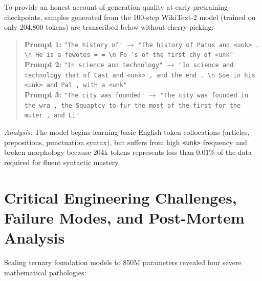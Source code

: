 \documentclass[11pt,a4paper]{article}
\begin{document}
To provide an honest account of generation quality at early pretraining checkpoints, samples generated from the 100-step WikiText-2 model (trained on only 204,800 tokens) are transcribed below without cherry-picking:
\begin{quote}
\small
\textbf{Prompt 1:} \texttt{"The history of"} $\to$ \texttt{"The history of Patus and <unk> . \textbackslash n He is a fewotes = = \textbackslash n Fo 's of the first chy of <unk"}\\
\textbf{Prompt 2:} \texttt{"In science and technology"} $\to$ \texttt{"In science and technology that of Cast and <unk> , and the end . \textbackslash n Soe in his <unk> and Pal , with a <unk"}\\
\textbf{Prompt 3:} \texttt{"The city was founded"} $\to$ \texttt{"The city was founded in the wra , the Squaptcy to fur the most of the first for the muter , and Li"}
\end{quote}
\textit{Analysis:} The model begins learning basic English token collocations (articles, prepositions, punctuation syntax), but suffers from high \texttt{<unk>} frequency and broken morphology because 204k tokens represents less than $0.01\%$ of the data required for fluent syntactic mastery.

\section{Critical Engineering Challenges, Failure Modes, and Post-Mortem Analysis}
\label{sec:pathologies}

Scaling ternary foundation models to 850M parameters revealed four severe mathematical pathologies:
\end{document}
